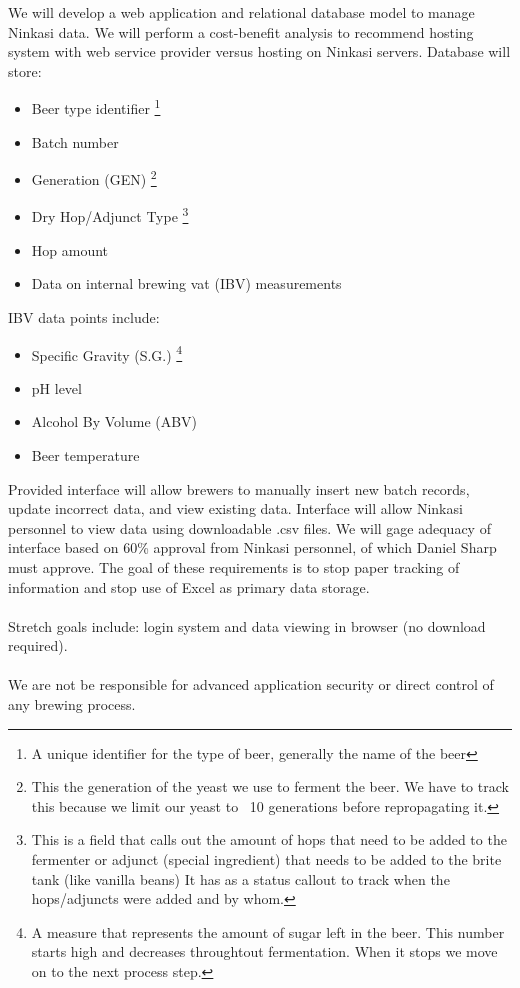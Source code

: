 \documentclass[draftclsnofoot,onecolumn,letterpaper,10pt,compsoc]{IEEEtran}
\begin{document}
		We will develop a web application and relational database model to manage Ninkasi data.
		We will perform a cost-benefit analysis to recommend hosting system with web service provider versus hosting on Ninkasi servers.
		Database will store:
		\begin{itemize}
			\item{
				Beer type identifier
				\footnote{A unique identifier for the type of beer, generally the name of the beer}
			}
			\item{
				Batch number
			}
			\item{
				Generation (GEN)
				\footnote{This the generation of the yeast we use to ferment the beer.
				We have to track this because we limit our yeast to ~10 generations before repropagating it.}
			}
			\item{
				Dry Hop/Adjunct Type
				\footnote{This is a field that calls out the amount of hops that need to be added to the fermenter or adjunct (special ingredient) that needs to be added to the brite tank (like vanilla beans)
				It has as a status callout to track when the hops/adjuncts were added and by whom.}
			}
			\item{Hop amount}
			\item{Data on internal brewing vat (IBV) measurements}
		\end{itemize}

		IBV data points include:
		\begin{itemize}
			\item{Specific Gravity (S.G.)
				\footnote{A measure that represents the amount of sugar left in the beer. This number starts high and decreases throughtout fermentation. When it stops we move on to the next process step.}}
			\item{pH level}
			\item{Alcohol By Volume (ABV)}
			\item{Beer temperature}
		\end{itemize}

		Provided interface will allow brewers to manually insert new batch records, update incorrect data, and view existing data.
		Interface will allow Ninkasi personnel to view data using downloadable .csv files.
		We will gage adequacy of interface based on 60\% approval from Ninkasi personnel, of which Daniel Sharp must approve.
		The goal of these requirements is to stop paper tracking of information and stop use of Excel as primary data storage.
		\\
		\\
		Stretch goals include: login system and data viewing in browser (no download required).
		\\
		\\
		We are not be responsible for advanced application security or direct control of any brewing process.
\end{document}
